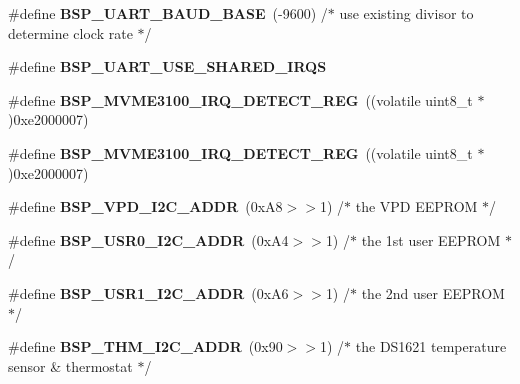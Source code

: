 \begin{DoxyCompactItemize}
\#define {\bfseries B\+S\+P\+\_\+\+U\+A\+R\+T\+\_\+\+B\+A\+U\+D\+\_\+\+B\+A\+SE}~(-\/9600) /$\ast$ use existing divisor to determine clock rate $\ast$/
\item 
\mbox{\label{group__RTEMSBSPsPowerPCMVME3100_ga99866d8b01bba3d166dfd16f4484a3da}} 
\#define {\bfseries B\+S\+P\+\_\+\+U\+A\+R\+T\+\_\+\+U\+S\+E\+\_\+\+S\+H\+A\+R\+E\+D\+\_\+\+I\+R\+QS}
\item 
\mbox{\label{group__RTEMSBSPsPowerPCMVME3100_ga4fbd0b85632b7aeef326284b99944e70}} 
\#define {\bfseries B\+S\+P\+\_\+\+M\+V\+M\+E3100\+\_\+\+I\+R\+Q\+\_\+\+D\+E\+T\+E\+C\+T\+\_\+\+R\+EG}~((volatile uint8\+\_\+t $\ast$)0xe2000007)
\item 
\mbox{\label{group__RTEMSBSPsPowerPCMVME3100_ga4fbd0b85632b7aeef326284b99944e70}} 
\#define {\bfseries B\+S\+P\+\_\+\+M\+V\+M\+E3100\+\_\+\+I\+R\+Q\+\_\+\+D\+E\+T\+E\+C\+T\+\_\+\+R\+EG}~((volatile uint8\+\_\+t $\ast$)0xe2000007)
\item 
\mbox{\label{group__RTEMSBSPsPowerPCMVME3100_ga465277ad03d2ee58789cf612e3d0cd65}} 
\#define {\bfseries B\+S\+P\+\_\+\+V\+P\+D\+\_\+\+I2\+C\+\_\+\+A\+D\+DR}~(0x\+A8$>$$>$1)		/$\ast$ the V\+P\+D E\+E\+P\+R\+O\+M  $\ast$/
\item 
\mbox{\label{group__RTEMSBSPsPowerPCMVME3100_gad443b3611ec482467b73621e8b95cb2f}} 
\#define {\bfseries B\+S\+P\+\_\+\+U\+S\+R0\+\_\+\+I2\+C\+\_\+\+A\+D\+DR}~(0x\+A4$>$$>$1)		/$\ast$ the 1st user E\+E\+P\+R\+O\+M $\ast$/
\item 
\mbox{\label{group__RTEMSBSPsPowerPCMVME3100_ga1f313ff86ef953b633189319b9287ea8}} 
\#define {\bfseries B\+S\+P\+\_\+\+U\+S\+R1\+\_\+\+I2\+C\+\_\+\+A\+D\+DR}~(0x\+A6$>$$>$1)		/$\ast$ the 2nd user E\+E\+P\+R\+O\+M $\ast$/
\item 
\mbox{\label{group__RTEMSBSPsPowerPCMVME3100_ga4f40108c07dd771369ed40641b220b29}} 
\#define {\bfseries B\+S\+P\+\_\+\+T\+H\+M\+\_\+\+I2\+C\+\_\+\+A\+D\+DR}~(0x90$>$$>$1)		/$\ast$ the D\+S1621 temperature sensor \& thermostat $\ast$/
\item 

\end{DoxyCompactItemize}

